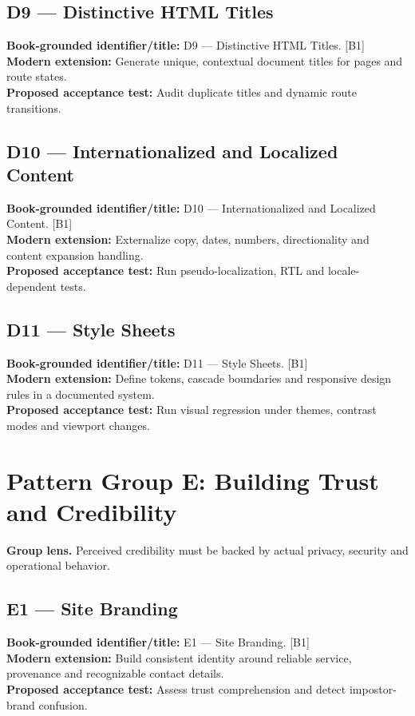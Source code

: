 \documentclass[11pt]{article}
\begin{document}
\subsection{D9 — Distinctive HTML Titles}
\noindent\textcolor{Ocean}{\textbf{Book-grounded identifier/title:}} D9 — Distinctive HTML Titles. [B1]\\
\textcolor{Mint}{\textbf{Modern extension:}} Generate unique, contextual document titles for pages and route states.\\
\textcolor{Amber}{\textbf{Proposed acceptance test:}} Audit duplicate titles and dynamic route transitions.\medskip
\subsection{D10 — Internationalized and Localized Content}
\noindent\textcolor{Ocean}{\textbf{Book-grounded identifier/title:}} D10 — Internationalized and Localized Content. [B1]\\
\textcolor{Mint}{\textbf{Modern extension:}} Externalize copy, dates, numbers, directionality and content expansion handling.\\
\textcolor{Amber}{\textbf{Proposed acceptance test:}} Run pseudo-localization, RTL and locale-dependent tests.\medskip
\subsection{D11 — Style Sheets}
\noindent\textcolor{Ocean}{\textbf{Book-grounded identifier/title:}} D11 — Style Sheets. [B1]\\
\textcolor{Mint}{\textbf{Modern extension:}} Define tokens, cascade boundaries and responsive design rules in a documented system.\\
\textcolor{Amber}{\textbf{Proposed acceptance test:}} Run visual regression under themes, contrast modes and viewport changes.\medskip
\section{Pattern Group E: Building Trust and Credibility}

\begin{notebox}\textbf{Group lens.} Perceived credibility must be backed by actual privacy, security and operational behavior.\end{notebox}
\subsection{E1 — Site Branding}
\noindent\textcolor{Ocean}{\textbf{Book-grounded identifier/title:}} E1 — Site Branding. [B1]\\
\textcolor{Mint}{\textbf{Modern extension:}} Build consistent identity around reliable service, provenance and recognizable contact details.\\
\textcolor{Amber}{\textbf{Proposed acceptance test:}} Assess trust comprehension and detect impostor-brand confusion.\medskip
\end{document}
